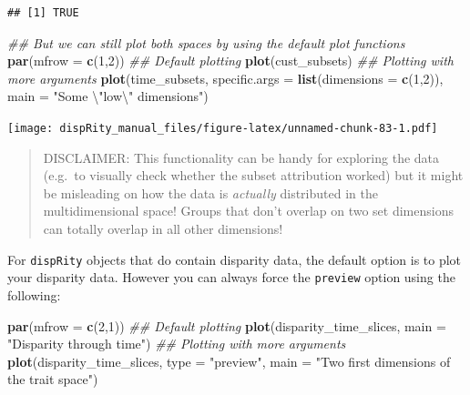 \documentclass[
]{book}
\newenvironment{Shaded}{\begin{snugshade}}{\end{snugshade}}
\newcommand{\CharTok}[1]{\textcolor[rgb]{0.31,0.60,0.02}{#1}}
\newcommand{\CommentTok}[1]{\textcolor[rgb]{0.56,0.35,0.01}{\textit{#1}}}
\newcommand{\DataTypeTok}[1]{\textcolor[rgb]{0.13,0.29,0.53}{#1}}
\newcommand{\DecValTok}[1]{\textcolor[rgb]{0.00,0.00,0.81}{#1}}
\newcommand{\KeywordTok}[1]{\textcolor[rgb]{0.13,0.29,0.53}{\textbf{#1}}}
\newcommand{\NormalTok}[1]{#1}
\newcommand{\StringTok}[1]{\textcolor[rgb]{0.31,0.60,0.02}{#1}}
\begin{document}
\begin{verbatim}
## [1] TRUE
\end{verbatim}

\begin{Shaded}
\begin{Highlighting}[]
\CommentTok{\#\# But we can still plot both spaces by using the default plot functions}
\KeywordTok{par}\NormalTok{(}\DataTypeTok{mfrow =} \KeywordTok{c}\NormalTok{(}\DecValTok{1}\NormalTok{,}\DecValTok{2}\NormalTok{))}
\CommentTok{\#\# Default plotting}
\KeywordTok{plot}\NormalTok{(cust\_subsets)}
\CommentTok{\#\# Plotting with more arguments}
\KeywordTok{plot}\NormalTok{(time\_subsets, }\DataTypeTok{specific.args =} \KeywordTok{list}\NormalTok{(}\DataTypeTok{dimensions =} \KeywordTok{c}\NormalTok{(}\DecValTok{1}\NormalTok{,}\DecValTok{2}\NormalTok{)),}
     \DataTypeTok{main =} \StringTok{"Some }\CharTok{\textbackslash{}"}\StringTok{low}\CharTok{\textbackslash{}"}\StringTok{ dimensions"}\NormalTok{)}
\end{Highlighting}
\end{Shaded}

\texttt{[image: dispRity\_manual\_files/figure-latex/unnamed-chunk-83-1.pdf]}

\begin{quote}
DISCLAIMER: This functionality can be handy for exploring the data (e.g.~to visually check whether the subset attribution worked) but it might be misleading on how the data is \emph{actually} distributed in the multidimensional space!
Groups that don't overlap on two set dimensions can totally overlap in all other dimensions!
\end{quote}

For \texttt{dispRity} objects that do contain disparity data, the default option is to plot your disparity data.
However you can always force the \texttt{preview} option using the following:

\begin{Shaded}
\begin{Highlighting}[]
\KeywordTok{par}\NormalTok{(}\DataTypeTok{mfrow =} \KeywordTok{c}\NormalTok{(}\DecValTok{2}\NormalTok{,}\DecValTok{1}\NormalTok{))}
\CommentTok{\#\# Default plotting}
\KeywordTok{plot}\NormalTok{(disparity\_time\_slices, }\DataTypeTok{main =} \StringTok{"Disparity through time"}\NormalTok{)}
\CommentTok{\#\# Plotting with more arguments}
\KeywordTok{plot}\NormalTok{(disparity\_time\_slices, }\DataTypeTok{type =} \StringTok{"preview"}\NormalTok{,}
     \DataTypeTok{main =} \StringTok{"Two first dimensions of the trait space"}\NormalTok{)}
\end{Highlighting}
\end{Shaded}
\end{document}
